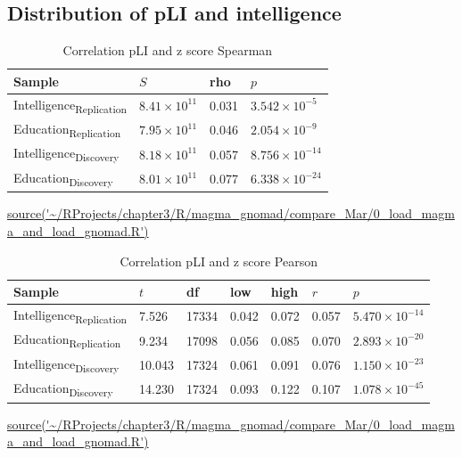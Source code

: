 \subsection{Distribution of pLI and intelligence}

\label{sec:pLI and intelligence and educational attainment}


\begin{table}[ht]
\centering
\setlength{\extrarowheight}{2pt}
\begin{tabular}{llll}
  \toprule
Sample & $S$ & rho & $p$ \\ 
  \midrule
Intelligence\textsubscript{Replication} & $8.41 \times 10^{11}$ & 0.031 & $3.542 \times 10^{-5}$ \\ 
  Education\textsubscript{Replication} & $7.95 \times 10^{11}$ & 0.046 & $2.054 \times 10^{-9}$ \\ 
  Intelligence\textsubscript{Discovery} & $8.18 \times 10^{11}$ & 0.057 & $8.756 \times 10^{-14}$ \\ 
  Education\textsubscript{Discovery} & $8.01 \times 10^{11}$ & 0.077 & $6.338 \times 10^{-24}$ \\ 
   \bottomrule
\end{tabular}
\caption{Correlation pLI and z score Spearman } 
\tiny\url{source('~/RProjects/chapter3/R/magma_gnomad/compare_Mar/0_load_magma_and_load_gnomad.R')}
\label{tab: Correlation pLI and z score Spearman}
\end{table}


\begin{table}[ht]
\centering
\setlength{\extrarowheight}{2pt}
\begin{tabular}{lllllll}
  \toprule
Sample & $t$ & df & low & high & $r$ & $p$ \\ 
  \midrule
Intelligence\textsubscript{Replication} & 7.526 & 17334 & 0.042 & 0.072 & 0.057 & $5.470 \times 10^{-14}$ \\ 
  Education\textsubscript{Replication} & 9.234 & 17098 & 0.056 & 0.085 & 0.070 & $2.893 \times 10^{-20}$ \\ 
  Intelligence\textsubscript{Discovery} & 10.043 & 17324 & 0.061 & 0.091 & 0.076 & $1.150 \times 10^{-23}$ \\ 
  Education\textsubscript{Discovery} & 14.230 & 17324 & 0.093 & 0.122 & 0.107 & $1.078 \times 10^{-45}$ \\ 
   \bottomrule
\end{tabular}
\caption{Correlation pLI and z score Pearson } 
\tiny\url{source('~/RProjects/chapter3/R/magma_gnomad/compare_Mar/0_load_magma_and_load_gnomad.R')}
\label{tab: Correlation pLI and z score Pearson}
\end{table}



